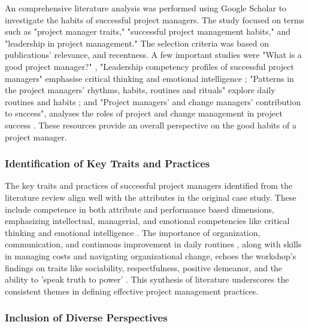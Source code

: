 \documentclass{article}
\begin{document}
An comprehensive literature analysis was performed using Google Scholar to investigate the habits of successful project managers. The study focused on terms such as "project manager traits," "successful project management habits," and "leadership in project management." The selection criteria was based on publications' relevance, and recentness. A few important studies were "What is a good project manager?" \cite{bredillet2015good}, "Leadership competency profiles of successful project managers" emphasise critical thinking and emotional intelligence \cite{muller2010leadership}; "Patterns in the project managers’ rhythms, habits, routines and rituals" explore daily routines and habits \cite{sigurdhssonpatterns}; and "Project managers’ and change managers’ contribution to success", analyses the roles of project and change management in project success \cite{pollack2016project}. These resources provide an overall perspective on the good habits of a project manager.

\subsubsection{Identification of Key Traits and Practices} 

The key traits and practices of successful project managers identified from the literature review align well with the attributes in the original case study. These include competence in both attribute and performance based dimensions, emphasizing intellectual, managerial, and emotional competencies like critical thinking and emotional intelligence \cite{muller2010leadership}. The importance of organization, communication, and continuous improvement in daily routines \cite{sigurdhssonpatterns}, along with skills in managing costs and navigating organizational change, echoes the workshop's findings on traits like sociability, respectfulness, positive demeanor, and the ability to 'speak truth to power' \cite{bredillet2015good}. This synthesis of literature underscores the consistent themes in defining effective project management practices.

\subsubsection{Inclusion of Diverse Perspectives}
\end{document}
